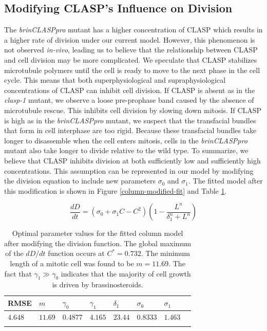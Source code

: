 \documentclass[referee,pdflatex,sn-mathphys-num]{sn-jnl}
\begin{document}
\subsection{Modifying CLASP's Influence on Division} 

The \emph{brinCLASPpro} mutant has a higher concentration of CLASP which results in a higher rate of division under our current model.
However, this phenomenon is not observed \emph{in-vivo}, leading us to believe that the relationship between CLASP and cell division may be more complicated.
We speculate that CLASP stabilizes microtubule polymers until the cell is ready to move to the next phase in the cell cycle.
This means that both superphysiological and supraphysiological concentrations of CLASP can inhibit cell division.
If CLASP is absent as in the \emph{clasp-1} mutant, we observe a loose pre-prophase band \cite{ambrose2007} caused by the absence of microtubule rescue.
This inhibits cell division by slowing down mitosis.
If CLASP is high as in the \emph{brinCLASPpro} mutant, we suspect that the transfacial bundles that form in cell interphase are too rigid.
Because these transfacial bundles take longer to disassemble when the cell enters mitosis, cells in the \emph{brinCLASPpro} mutant also take longer to divide relative to the wild type.
To summarize, we believe that CLASP inhibits division at both sufficiently low and sufficiently high concentrations.
This assumption can be represented in our model by modifying the division equation to include new parameters $\sigma_{0}$ and $\sigma_{1}$.
The fitted model after this modification is shown in Figure \ref{column-modified-fit} and Table \ref{column-modified-parameters}.

\begin{equation}
\label{division-modified}
\frac{dD}{dt} = \left( \sigma_{0} + \sigma_{1}C - C^{2} \right)\left( 1 - \frac{L^{n}}{\delta_{1}^{n} + L^{n}} \right) 
\end{equation}


\begin{table}[!ht]
\centering
\caption{Optimal parameter values for the fitted column model after modifying the division function.
The global maximum of the $dD/dt$ function occurs at $C^{*} = 0.732$.
The minimum length of a mitotic cell was found to be $m = 11.69$.
The fact that $\gamma_{1} \gg \gamma_{0}$ indicates that the majority of cell growth is driven by brassinosteroids. }
\label{column-modified-parameters}
\begin{tabular}{@{}llllllll@{}}
\toprule
RMSE & $m$ & $\gamma_{0}$ & $\gamma_{1}$ & $\delta_{1}$ & $\sigma_{0}$ & $\sigma_{1}$ \\
\midrule
$4.648$ & $11.69$ & $0.4877$ & $4.165$ & $23.44$ & $0.8333$ & $1.463$ \\
\botrule
\end{tabular}
\end{table}
\end{document}
